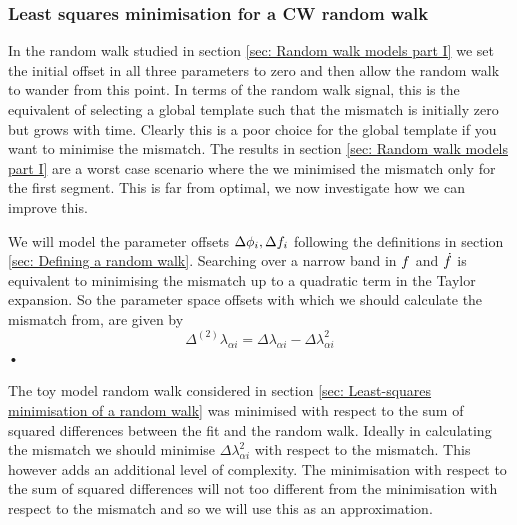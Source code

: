 \subsubsection{Least squares minimisation for a CW random walk}
\label{sec: Least squares minimisation for a CW random walk}

In the random walk studied in section \ref{sec: Random walk models part I} we
set the initial offset in all three parameters to zero and then allow the
random walk to wander from this point. In terms of the random walk signal, this
is the equivalent of selecting a global template such that the mismatch is
initially zero but grows with time. Clearly this is a poor choice for the
global template if you want to minimise the mismatch. The results in section
\ref{sec: Random walk models part I} are a worst case scenario where the we
minimised the mismatch only for the first segment.  This is far from optimal,
we now investigate how we can improve this.

We will model the parameter offsets $\Delta\phi_{i}, \Delta f_{i}$ 
following the definitions in section \ref{sec: Defining a random walk}. 
Searching over a narrow band in $f$ and $\dot{f}$
is equivalent to minimising the mismatch up to a quadratic term in the Taylor
expansion. So the parameter space offsets with which we should calculate the
mismatch from, are given by
\begin{equation}
\Delta^{(2)}\lambda_{\alpha i} = \Delta\lambda_{\alpha i} - \Delta\lambda_{\alpha i}^{2}
\end{equation}•

The toy model random walk considered in section \ref{sec: Least-squares
minimisation of a random walk} was minimised with respect to the sum of squared
differences between the fit and the random walk. Ideally in calculating the mismatch
we should minimise $\Delta\lambda_{\alpha i}^{2}$ with respect to the
mismatch. This however adds an additional level of complexity. The minimisation
with respect to the sum of squared differences will not too different from the
minimisation with respect to the mismatch and so we will use this as an
approximation.

